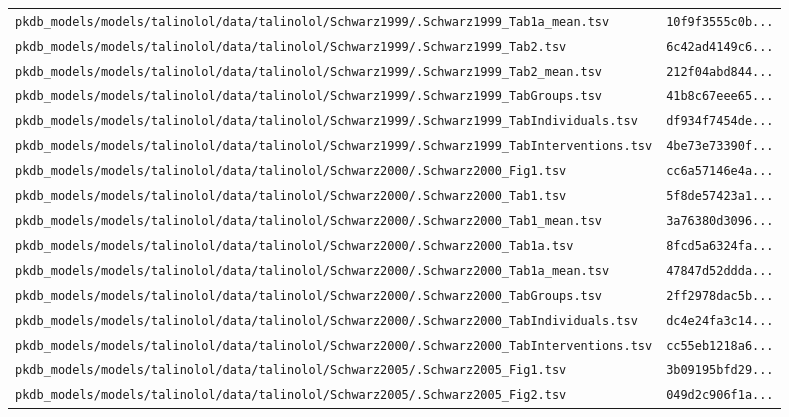 \begin{longtable}{ll}
\texttt{pkdb\_models/models/talinolol/data/talinolol/Schwarz1999/.Schwarz1999\_Tab1a\_mean.tsv} & \texttt{10f9f3555c0b...} \\
\texttt{pkdb\_models/models/talinolol/data/talinolol/Schwarz1999/.Schwarz1999\_Tab2.tsv} & \texttt{6c42ad4149c6...} \\
\texttt{pkdb\_models/models/talinolol/data/talinolol/Schwarz1999/.Schwarz1999\_Tab2\_mean.tsv} & \texttt{212f04abd844...} \\
\texttt{pkdb\_models/models/talinolol/data/talinolol/Schwarz1999/.Schwarz1999\_TabGroups.tsv} & \texttt{41b8c67eee65...} \\
\texttt{pkdb\_models/models/talinolol/data/talinolol/Schwarz1999/.Schwarz1999\_TabIndividuals.tsv} & \texttt{df934f7454de...} \\
\texttt{pkdb\_models/models/talinolol/data/talinolol/Schwarz1999/.Schwarz1999\_TabInterventions.tsv} & \texttt{4be73e73390f...} \\
\texttt{pkdb\_models/models/talinolol/data/talinolol/Schwarz2000/.Schwarz2000\_Fig1.tsv} & \texttt{cc6a57146e4a...} \\
\texttt{pkdb\_models/models/talinolol/data/talinolol/Schwarz2000/.Schwarz2000\_Tab1.tsv} & \texttt{5f8de57423a1...} \\
\texttt{pkdb\_models/models/talinolol/data/talinolol/Schwarz2000/.Schwarz2000\_Tab1\_mean.tsv} & \texttt{3a76380d3096...} \\
\texttt{pkdb\_models/models/talinolol/data/talinolol/Schwarz2000/.Schwarz2000\_Tab1a.tsv} & \texttt{8fcd5a6324fa...} \\
\texttt{pkdb\_models/models/talinolol/data/talinolol/Schwarz2000/.Schwarz2000\_Tab1a\_mean.tsv} & \texttt{47847d52ddda...} \\
\texttt{pkdb\_models/models/talinolol/data/talinolol/Schwarz2000/.Schwarz2000\_TabGroups.tsv} & \texttt{2ff2978dac5b...} \\
\texttt{pkdb\_models/models/talinolol/data/talinolol/Schwarz2000/.Schwarz2000\_TabIndividuals.tsv} & \texttt{dc4e24fa3c14...} \\
\texttt{pkdb\_models/models/talinolol/data/talinolol/Schwarz2000/.Schwarz2000\_TabInterventions.tsv} & \texttt{cc55eb1218a6...} \\
\texttt{pkdb\_models/models/talinolol/data/talinolol/Schwarz2005/.Schwarz2005\_Fig1.tsv} & \texttt{3b09195bfd29...} \\
\texttt{pkdb\_models/models/talinolol/data/talinolol/Schwarz2005/.Schwarz2005\_Fig2.tsv} & \texttt{049d2c906f1a...} \\

\end{longtable}
